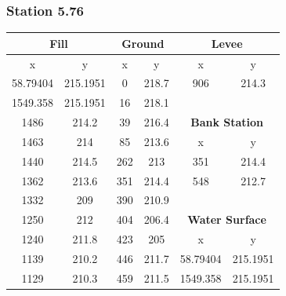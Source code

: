 \subsubsection{Station 5.76}
\begin{center}
\begin{tabular}{|cc||cc||cc|} 
    \hline
    \multicolumn{2}{|c||}{\textbf{Fill}} & \multicolumn{2}{c||}{\textbf{Ground}} & \multicolumn{2}{c|}{\textbf{Levee}}           \\ 
    \hline
    x        & y                        & x    & y                             & x        & y                                  \\
    58.79404 & 215.1951                 & 0    & 218.7                         & 906      & 214.3                              \\
    1549.358 & 215.1951                 & 16   & 218.1                         &          &                                    \\
    1486     & 214.2                    & 39   & 216.4                         & \multicolumn{2}{c|}{\textbf{Bank Station}}    \\ 
    \cline{5-6}
    1463     & 214                      & 85   & 213.6                         & x        & y                                  \\
    1440     & 214.5                    & 262  & 213                           & 351      & 214.4                              \\
    1362     & 213.6                    & 351  & 214.4                         & 548      & 212.7                              \\
    1332     & 209                      & 390  & 210.9                         &          &                                    \\
    1250     & 212                      & 404  & 206.4                         & \multicolumn{2}{c|}{\textbf{Water Surface}}   \\ 
    \cline{5-6}
    1240     & 211.8                    & 423  & 205                           & x        & y                                  \\
    1139     & 210.2                    & 446  & 211.7                         & 58.79404 & 215.1951                           \\
    1129     & 210.3                    & 459  & 211.5                         & 1549.358 & 215.1951                           \\

\end{tabular}
\end{center}
